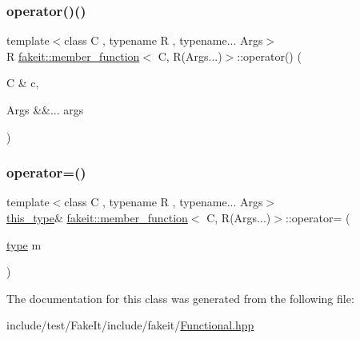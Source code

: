 \mbox{\label{classfakeit_1_1member__function_3_01C_00_01R_07Args_8_8_8_08_4_a2c1d2dc93f029885569976989a0f49fd}} 
\subsubsection{\texorpdfstring{operator()()}{operator()()}}
{\footnotesize\ttfamily template$<$class C , typename R , typename... Args$>$ \\
R \mbox{\hyperlink{classfakeit_1_1member__function}{fakeit\+::member\+\_\+function}}$<$ C, R(Args...)$>$\+::operator() (\begin{DoxyParamCaption}\item[{C \&}]{c,  }\item[{Args \&\&...}]{args }\end{DoxyParamCaption})\hspace{0.3cm}{\ttfamily [inline]}}

\mbox{\label{classfakeit_1_1member__function_3_01C_00_01R_07Args_8_8_8_08_4_ab1241ada2652994eae30c8bf0f2cc5aa}} 
\subsubsection{\texorpdfstring{operator=()}{operator=()}}
{\footnotesize\ttfamily template$<$class C , typename R , typename... Args$>$ \\
\mbox{\hyperlink{classfakeit_1_1member__function_3_01C_00_01R_07Args_8_8_8_08_4_a2f0619303f6394749b3d110408a6945a}{this\+\_\+type}}\& \mbox{\hyperlink{classfakeit_1_1member__function}{fakeit\+::member\+\_\+function}}$<$ C, R(Args...)$>$\+::operator= (\begin{DoxyParamCaption}\item[{\mbox{\hyperlink{classfakeit_1_1member__function_3_01C_00_01R_07Args_8_8_8_08_4_a21761d9e5d16d880e677d266fc331aaa}{type}}}]{m }\end{DoxyParamCaption})\hspace{0.3cm}{\ttfamily [inline]}}



The documentation for this class was generated from the following file\+:\begin{DoxyCompactItemize}
\item 
include/test/\+Fake\+It/include/fakeit/\mbox{\hyperlink{Functional_8hpp}{Functional.\+hpp}}\end{DoxyCompactItemize}
